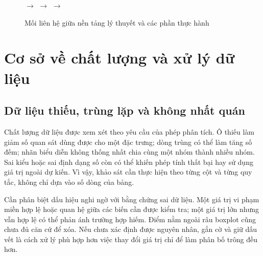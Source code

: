 \documentclass[12pt,a4paper,oneside]{report}
\begin{document}
\begin{figure}[htbp]
  \centering
  \begingroup
  \footnotesize
  \setlength{\fboxsep}{4pt}
  \hfill $\longrightarrow$ \hfill
  \hfill $\longrightarrow$ \hfill
  \hfill $\longrightarrow$ \hfill
  \endgroup
  \caption{Mối liên hệ giữa nền tảng lý thuyết và các phần thực hành}
  \label{fig:machtrinhbay}
\end{figure}

\section{Cơ sở về chất lượng và xử lý dữ liệu}
\label{sec:chatluongdulieu}

\subsection{Dữ liệu thiếu, trùng lặp và không nhất quán}

Chất lượng dữ liệu được xem xét theo yêu cầu của phép phân tích. Ô thiếu làm giảm số quan sát dùng được cho một đặc trưng; dòng trùng có thể làm tăng số đếm; nhãn biểu diễn không thống nhất chia cùng một nhóm thành nhiều nhóm. Sai kiểu hoặc sai định dạng số còn có thể khiến phép tính thất bại hay sử dụng giá trị ngoài dự kiến. Vì vậy, khảo sát cần thực hiện theo từng cột và từng quy tắc, không chỉ dựa vào số dòng của bảng.

Cần phân biệt dấu hiệu nghi ngờ với bằng chứng sai dữ liệu. Một giá trị vi phạm miền hợp lệ hoặc quan hệ giữa các biến cần được kiểm tra; một giá trị lớn nhưng vẫn hợp lệ có thể phản ánh trường hợp hiếm. Điểm nằm ngoài râu boxplot cũng chưa đủ căn cứ để xóa. Nếu chưa xác định được nguyên nhân, gắn cờ và giữ dấu vết là cách xử lý phù hợp hơn việc thay đổi giá trị chỉ để làm phân bố trông đều hơn.
\end{document}
